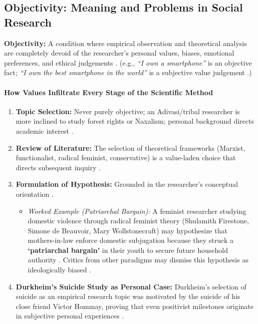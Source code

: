 \subsection{Objectivity: Meaning and Problems in Social Research}
\textbf{Objectivity:} A condition where empirical observation and theoretical analysis are completely devoid of the researcher's personal values, biases, emotional preferences, and ethical judgements . (e.g., \textit{``I own a smartphone''} is an objective fact; \textit{``I own the best smartphone in the world''} is a subjective value judgement .)

\paragraph{How Values Infiltrate Every Stage of the Scientific Method}
\begin{enumerate}
    \item \textbf{Topic Selection:} Never purely objective; an Adivasi/tribal researcher is more inclined to study forest rights or Naxalism; personal background directs academic interest .
    \item \textbf{Review of Literature:} The selection of theoretical frameworks (Marxist, functionalist, radical feminist, conservative) is a value-laden choice that directs subsequent inquiry .
    \item \textbf{Formulation of Hypothesis:} Grounded in the researcher's conceptual orientation .
    \begin{itemize}
        \item \textit{Worked Example (Patriarchal Bargain):} A feminist researcher studying domestic violence through radical feminist theory (Shulamith Firestone, Simone de Beauvoir, Mary Wollstonecraft) may hypothesize that mothers-in-law enforce domestic subjugation because they struck a \textbf{`patriarchal bargain'} in their youth to secure future household authority . Critics from other paradigms may dismiss this hypothesis as ideologically biased .
    \end{itemize}
    \item \textbf{Durkheim's Suicide Study as Personal Case:} Durkheim's selection of suicide as an empirical research topic was motivated by the suicide of his close friend Victor Hommay, proving that even positivist milestones originate in subjective personal experiences .
\end{enumerate}

